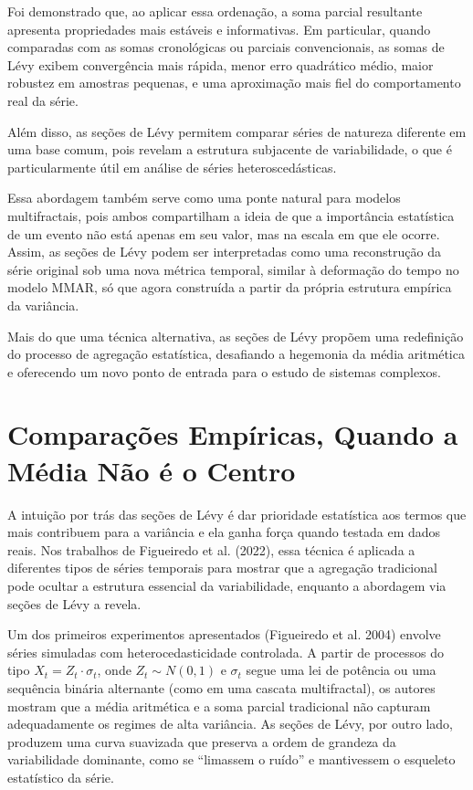 \documentclass[
  letterpaper,
  DIV=11,
  numbers=noendperiod]{scrartcl}
\begin{document}
Foi demonstrado que, ao aplicar essa ordenação, a soma parcial
resultante apresenta propriedades mais estáveis e informativas. Em
particular, quando comparadas com as somas cronológicas ou parciais
convencionais, as somas de Lévy exibem convergência mais rápida, menor
erro quadrático médio, maior robustez em amostras pequenas, e uma
aproximação mais fiel do comportamento real da série.

Além disso, as seções de Lévy permitem comparar séries de natureza
diferente em uma base comum, pois revelam a estrutura subjacente de
variabilidade, o que é particularmente útil em análise de séries
heteroscedásticas.

Essa abordagem também serve como uma ponte natural para modelos
multifractais, pois ambos compartilham a ideia de que a importância
estatística de um evento não está apenas em seu valor, mas na escala em
que ele ocorre. Assim, as seções de Lévy podem ser interpretadas como
uma reconstrução da série original sob uma nova métrica temporal,
similar à deformação do tempo no modelo MMAR, só que agora construída a
partir da própria estrutura empírica da variância.

Mais do que uma técnica alternativa, as seções de Lévy propõem uma
redefinição do processo de agregação estatística, desafiando a hegemonia
da média aritmética e oferecendo um novo ponto de entrada para o estudo
de sistemas complexos.

\section{Comparações Empíricas, Quando a Média Não é o
Centro}\label{comparauxe7uxf5es-empuxedricas-quando-a-muxe9dia-nuxe3o-uxe9-o-centro}

A intuição por trás das seções de Lévy é dar prioridade estatística aos
termos que mais contribuem para a variância e ela ganha força quando
testada em dados reais. Nos trabalhos de Figueiredo et al. (2022), essa
técnica é aplicada a diferentes tipos de séries temporais para mostrar
que a agregação tradicional pode ocultar a estrutura essencial da
variabilidade, enquanto a abordagem via seções de Lévy a revela.

Um dos primeiros experimentos apresentados (Figueiredo et al. 2004)
envolve séries simuladas com heterocedasticidade controlada. A partir de
processos do tipo \(X_t = Z_t \cdot \sigma_t\), onde \(Z_t \sim N(0,1)\)
e \(\sigma_t\) segue uma lei de potência ou uma sequência binária
alternante (como em uma cascata multifractal), os autores mostram que a
média aritmética e a soma parcial tradicional não capturam adequadamente
os regimes de alta variância. As seções de Lévy, por outro lado,
produzem uma curva suavizada que preserva a ordem de grandeza da
variabilidade dominante, como se ``limassem o ruído'' e mantivessem o
esqueleto estatístico da série.
\end{document}

